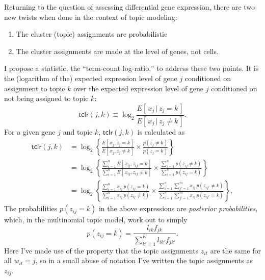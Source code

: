 \documentclass[final]{siamart171218}
\begin{document}
Returning to the question of assessing differential gene expression,
there are two new twists when done in the context of topic modeling:
\begin{enumerate}
  
\item The cluster (topic) assignments are probabilistic

\item The cluster assignments are
  made at the level of genes, not cells.

\end{enumerate}
I propose a statistic, the ``term-count log-ratio,'' to address these
two points. It is the (logarithm of the) expected expression level of
gene $j$ conditioned on assignment to topic $k$ over the expected
expression level of gene $j$ conditioned on not being assigned to
topic $k$:
\begin{equation}
\mathsf{tclr}(j,k) \equiv
\log_2 \frac{E[\,x_j \,|\, z_j = k\,]}{E[\,x_j \,|\, z_j \neq k\,]}.
\end{equation}
For a given gene $j$ and topic $k$, $\mathsf{tclr}(j,k)$ is calculated
as
\begin{align}
\mathsf{tclr}(j,k) &=
\log_2 \left\{ \frac{E[\, x_j, z_j = k \,]}{E[\, x_j, z_j \neq k\,]} \times
\frac{p(z_j \neq k)}{p(z_j = k)} \right\} \nonumber \\
&= \log_2 \left\{ \frac{\sum_{i=1}^n E[\, x_{ij}, z_{ij} = k \,]}
                       {\sum_{i=1}^n E[\, x_{ij}, z_{ij} \neq k\,]} \times
                  \frac{\sum_{i=1}^n p(z_{ij} \neq k)}
                       {\sum_{i=1}^n p(z_{ij} = k)} \right\} \nonumber \\
&= \log_2 \left\{ \frac{\sum_{i=1}^n x_{ij} \, p(z_{ij} = k)}
                       {\sum_{i=1}^n x_{ij} \, p(z_{ij} \neq k)} \times
                  \frac{\sum_{i=1}^n \sum_{j'=1}^m x_{ij} \, p(z_{ij'} \neq k)}
                       {\sum_{i=1}^n \sum_{j'=1}^m x_{ij} \, p(z_{ij'} = k)}
                  \right\},
\label{eq:tclr}
\end{align}
The probabilities $p(z_{ij} = k)$ in the above expressions are {\em
posterior probabilities}, which, in the multinomial topic model,
work out to simply
\begin{equation}
p(z_{ij} = k) = \frac{l_{ik} f_{jk}}{\sum_{k'=1}^K l_{ik'} f_{jk'}}.
\end{equation}
Here I've made use of the property that the topic assignments $z_{it}$
are the same for all $w_{it} = j$, so in a small abuse of notation
I've written the topic assignments as $z_{ij}$.
\end{document}
